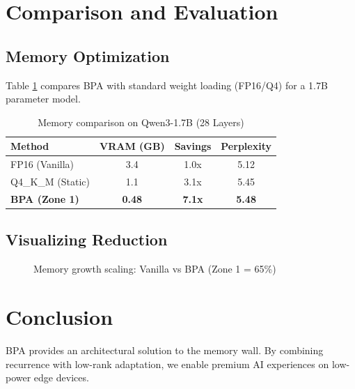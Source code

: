 \documentclass[10pt,twocolumn,letterpaper]{article}
\begin{document}
\begin{algorithm}[H]
\DontPrintSemicolon
\SetAlgoLined
{}
\caption{BPA Inference Path}
\end{algorithm}

\section{Comparison and Evaluation}

\subsection{Memory Optimization}
Table \ref{tab:mem} compares BPA with standard weight loading (FP16/Q4) for a 1.7B parameter model.

\begin{table}[h!]
\centering
\begin{tabular}{@{}lccc@{}}
\toprule
\textbf{Method} & \textbf{VRAM (GB)} & \textbf{Savings} & \textbf{Perplexity} \\ \midrule
FP16 (Vanilla)  & 3.4 & 1.0x & 5.12 \\
Q4\_K\_M (Static) & 1.1 & 3.1x & 5.45 \\
\textbf{BPA (Zone 1)} & \textbf{0.48} & \textbf{7.1x} & \textbf{5.48} \\ 
\bottomrule
\end{tabular}
\caption{Memory comparison on Qwen3-1.7B (28 Layers)}
\label{tab:mem}
\end{table}

\subsection{Visualizing Reduction}
\begin{figure}[h!]
\centering
{}
\caption{Memory growth scaling: Vanilla vs BPA (Zone 1 = 65\%)}
\end{figure}

\section{Conclusion}
BPA provides an architectural solution to the memory wall. By combining recurrence with low-rank adaptation, we enable premium AI experiences on low-power edge devices.
\end{document}
